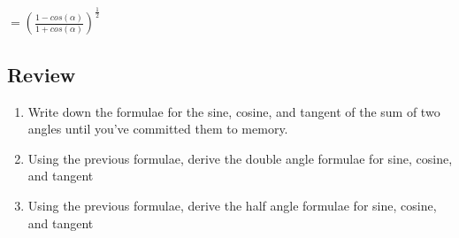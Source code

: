 \tab$ = (\frac{1 - cos(\alpha)}{1 + cos(\alpha)})^{\frac{1}{2}}$\\

\subsection{Review}

\begin{enumerate}

\item{Write down the formulae for the sine, cosine, and tangent of the sum of two angles until you've committed them to memory.}\\

\item{Using the previous formulae, derive the double angle formulae for sine, cosine, and tangent}

\item{Using the previous formulae, derive the half angle formulae for sine, cosine, and tangent}

\end{enumerate}
